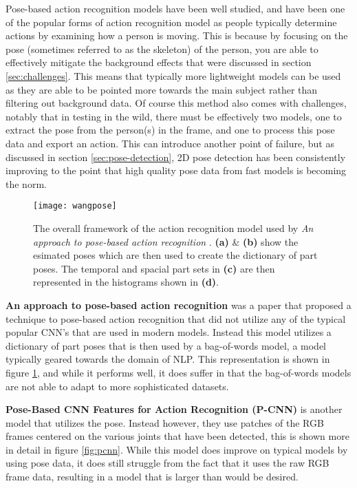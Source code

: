 Pose-based action recognition models have been well studied, and have been one of the popular forms of action recognition model as people typically determine actions by examining how a person is moving. This is because by focusing on the pose (sometimes referred to as the skeleton) of the person, you are able to effectively mitigate the background effects that were discussed in section \ref{sec:challenges}. This means that typically more lightweight models can be used as they are able to be pointed more towards the main subject rather than filtering out background data. Of course this method also comes with challenges, notably that in testing in the wild, there must be effectively two models, one to extract the pose from the person(s) in the frame, and one to process this pose data and export an action. This can introduce another point of failure, but as discussed in section \ref{sec:pose-detection}, 2D pose detection has been consistently improving to the point that high quality pose data from fast models is becoming the norm.

\begin{figure}[ht]
	\texttt{[image: wangpose]}
	\centering
	\caption{The overall framework of the action recognition model used by \textit{An approach to pose-based action recognition} \cite{WangPose}. \textbf{(a)} \& \textbf{(b)} show the esimated poses which are then used to create the dictionary of part poses. The temporal and spacial part sets in \textbf{(c)} are then represented in the histograms shown in \textbf{(d)}.}
	\label{fig:wangpose}
\end{figure}

\textbf{An approach to pose-based action recognition} \cite{WangPose} was a paper that proposed a technique to pose-based action recognition that did not utilize any of the typical popular CNN's that are used in modern models. Instead this model utilizes a dictionary of part poses that is then used by a bag-of-words model, a model typically geared towards the domain of NLP. This representation is shown in figure \ref{fig:wangpose}, and  while it performs well, it does suffer in that the bag-of-words models are not able to adapt to more sophisticated datasets.

\textbf{Pose-Based CNN Features for Action Recognition (P-CNN)} \cite{PCNN} is another model that utilizes the pose. Instead however, they use patches of the RGB frames centered on the various joints that have been detected, this is shown more in detail in figure \ref{fig:pcnn}. While this model does improve on typical models by using pose data, it does still struggle from the fact that it uses the raw RGB frame data, resulting in a model that is larger than would be desired.

